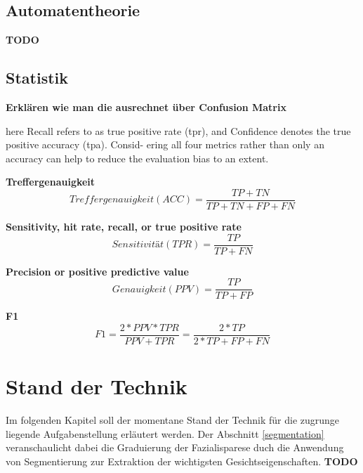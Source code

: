 \section{Automatentheorie}\label{automatatheory}
\textbf{TODO}

\section{Statistik}\label{statistics}
\textbf{Erklären wie man die ausrechnet über Confusion Matrix}



here Recall refers to as true positive rate (tpr), and
Confidence denotes the true positive accuracy (tpa). Consid-
ering all four metrics rather than only an accuracy can help
to reduce the evaluation bias to an extent.


\textbf{Treffergenauigkeit}
\begin{equation}
Treffergenauigkeit (ACC) = \frac{TP+TN}{TP + TN + FP + FN}
\end{equation}

\textbf{Sensitivity, hit rate, recall, or true positive rate}
\begin{equation}
Sensitivität (TPR) = \frac{TP}{TP + FN}
\end{equation}

\textbf{Precision or positive predictive value}
\begin{equation}
Genauigkeit (PPV) = \frac{TP}{TP + FP}
\end{equation}

\textbf{F1}
\begin{equation}
F1 = \frac{2 * PPV * TPR}{PPV + TPR} = \frac{2 * TP}{2 * TP + FP + FN}
\end{equation}


























\chapter{Stand der Technik}\label{std}

Im folgenden Kapitel soll der momentane  Stand der Technik für die zugrunge liegende Aufgabenstellung erläutert werden. Der Abschnitt \ref{segmentation} veranschaulicht dabei die Graduierung der Fazialisparese duch die Anwendung von Segmentierung zur Extraktion der wichtigsten Gesichtseigenschaften.
\textbf{TODO}

